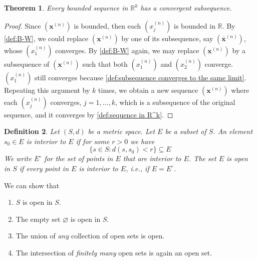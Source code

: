 \documentclass[12pt, lettersize]{book}
\newtheorem{thm}{Theorem}[section]
\newtheorem{dfn}[thm]{Definition}
\let\emptyset\varnothing
\begin{document}
	\begin{thm}
		Every bounded sequence in $\mathbb{R}^k$ has a convergent subsequence.
	\end{thm}
	\begin{proof}
		Since $(\textbf{x}^{(n)})$ is bounded, then each $(x_j^{(n)})$ is bounded in $\mathbb{R}$. By \ref{def:B-W}, we
		could replace $(\textbf{x}^{(n)})$ by one of its subsequence, say $(\bar{\mathbf{x}}^{(n)})$, whose $(x_1^{(n)})$
		converges. By \ref{def:B-W} again, we may replace $(\textbf{x}^{(n)})$ by a subsequence of $(\textbf{x}^{(n)})$ such
		that both $(x_1^{(n)})$ and $(x_2^{(n)})$ converge. $(x_1^{(n)})$ still converges because \ref{def:subsequence converges to the same limit}. Repeating this argument by $k$ times, we obtain a new sequence $(\textbf{x}^{(n)})$ where each $(x_j^{(n)})$ converges, $j=1,\dots,k$, which is a subsequence of the original sequence, and it converges by \ref{def:sequence in R^k}. 
	\end{proof}
	
	\begin{dfn}
		Let $(S,d)$ be a metric space. Let $E$ be a subset of $S$. An element $s_0\in E$ is \emph{interior} to $E$ if for some $r>0$ we have
		\begin{displaymath}
			\{s\in S: d(s,s_0)<r\}\subseteq E
		\end{displaymath}
		We write $E^\circ$ for the set of points in $E$ that are interior to $E$. The set $E$ is \emph{open} in $S$ if every point in $E$ is interior to $E$, i.e., if $E=E^\circ$.
	\end{dfn}
	We can show that
	\begin{enumerate}
		\item $S$ is open in $S$.
		\item The empty set $\emptyset$ is open in $S$.
		\item The union of \emph{any} collection of open sets is open.
		\item The intersection of \emph{finitely many} open sets is again an open set.
	\end{enumerate}
	
\end{document}
